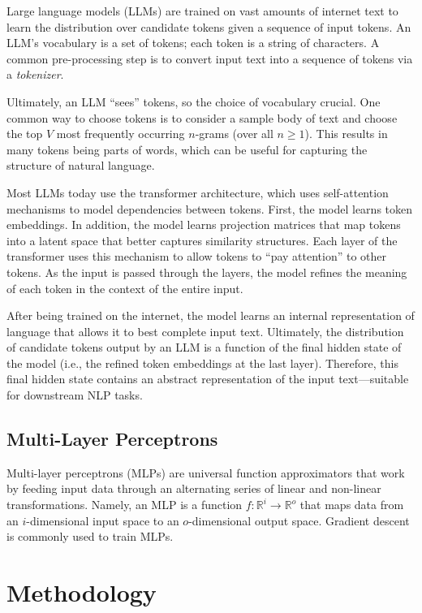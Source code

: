 \documentclass{article}
\begin{document}
Large language models (LLMs) are trained on vast amounts of internet text to learn the distribution over candidate tokens given a sequence of input tokens. An LLM's vocabulary is a set of tokens; each token is a string of characters. A common pre-processing step is to convert input text into a sequence of tokens via a \emph{tokenizer}.

Ultimately, an LLM ``sees'' tokens, so the choice of vocabulary crucial. One common way to choose tokens is to consider a sample body of text and choose the top $V$ most frequently occurring $n$-grams (over all $n\ge 1$). This results in many tokens being parts of words, which can be useful for capturing the structure of natural language.

Most LLMs today use the transformer architecture, which uses self-attention mechanisms to model dependencies between tokens. First, the model learns token embeddings. In addition, the model learns projection matrices that map tokens into a latent space that better captures similarity structures. Each layer of the transformer uses this mechanism to allow tokens to ``pay attention'' to other tokens. As the input is passed through the layers, the model refines the meaning of each token in the context of the entire input.

After being trained on the internet, the model learns an internal representation of language that allows it to best complete input text. Ultimately, the distribution of candidate tokens output by an LLM is a function of the final hidden state of the model (i.e., the refined token embeddings at the last layer). Therefore, this final hidden state contains an abstract representation of the input text---suitable for downstream NLP tasks.

\subsection{Multi-Layer Perceptrons}

Multi-layer perceptrons (MLPs) are universal function approximators that work by feeding input data through an alternating series of linear and non-linear transformations. Namely, an MLP is a function $f: \mathbb{R}^i \rightarrow \mathbb{R}^o$ that maps data from an $i$-dimensional input space to an $o$-dimensional output space. Gradient descent is commonly used to train MLPs.

\section{Methodology}
\end{document}
